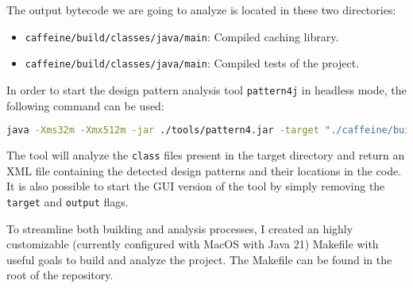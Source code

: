 The output bytecode we are going to analyze is located in these two directories:

\begin{itemize}
  \item \texttt{caffeine/build/classes/java/main}: Compiled caching library.
  \item \texttt{caffeine/build/classes/java/main}: Compiled tests of the project.
\end{itemize}

\noindent In order to start the design pattern analysis tool \texttt{pattern4j} in headless mode, the following command can be used:

\begin{lstlisting}[language=bash, caption={Bash command to start the pattern4j design pattern analysis tool without GUI}]
              java -Xms32m -Xmx512m -jar ./tools/pattern4.jar -target "./caffeine/build/classes/java/main" -output "./results/out.xml"
\end{lstlisting}

\noindent The tool will analyze the \texttt{class} files present in the target directory and return an XML file containing the detected design patterns and their locations in the code. It is also possible to start the GUI version of the tool by simply removing the \texttt{target} and \texttt{output} flags.

To streamline both building and analysis processes, I created an highly customizable (currently configured with MacOS with Java 21) Makefile with useful goals to build and analyze the project. The Makefile can be found in the root of the repository.

